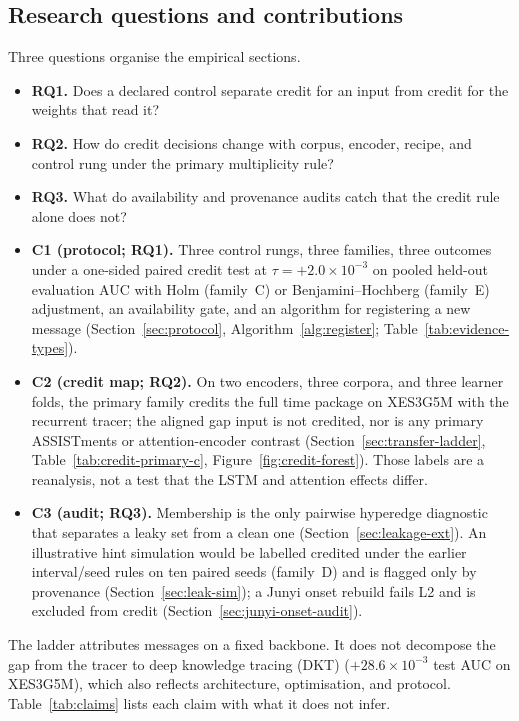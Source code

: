 \documentclass[review,12pt]{elsarticle}
\begin{document}
\subsection{Research questions and contributions}
Three questions organise the empirical sections.
\begin{itemize}
  \item \textbf{RQ1.} Does a declared control separate credit for an
  input from credit for the weights that read it?
  \item \textbf{RQ2.} How do credit decisions change with corpus,
  encoder, recipe, and control rung under the primary multiplicity rule?
  \item \textbf{RQ3.} What do availability and provenance audits catch
  that the credit rule alone does not?
\end{itemize}
\begin{itemize}
  \item \textbf{C1 (protocol; RQ1).} Three control rungs, three families,
  three outcomes under a one-sided paired credit test at
  $\tau{=}{+}2.0\times 10^{-3}$ on pooled held-out evaluation AUC with
  Holm (family~C) or Benjamini--Hochberg (family~E) adjustment, an
  availability gate, and an algorithm
  for registering a new message (Section~\ref{sec:protocol},
  Algorithm~\ref{alg:register}; Table~\ref{tab:evidence-types}).
  \item \textbf{C2 (credit map; RQ2).} On two encoders, three corpora,
  and three learner folds, the primary family credits the full time
  package on XES3G5M with the recurrent tracer; the aligned gap input
  is not credited, nor is any primary ASSISTments or attention-encoder
  contrast (Section~\ref{sec:transfer-ladder},
  Table~\ref{tab:credit-primary-c}, Figure~\ref{fig:credit-forest}).
  Those labels are a reanalysis, not a test that the LSTM and attention
  effects differ.
  \item \textbf{C3 (audit; RQ3).} Membership is the only pairwise
  hyperedge diagnostic that separates a leaky set from a clean one
  (Section~\ref{sec:leakage-ext}). An illustrative hint simulation would
  be labelled credited under the earlier interval/seed rules on ten
  paired seeds (family~D) and is flagged only by provenance
  (Section~\ref{sec:leak-sim}); a Junyi onset rebuild fails L2 and is
  excluded from credit (Section~\ref{sec:junyi-onset-audit}).
\end{itemize}
The ladder attributes messages on a fixed backbone. It does not
decompose the gap from the tracer to deep knowledge tracing (DKT)
\cite{piech2015dkt} ($+28.6\times 10^{-3}$ test AUC on
XES3G5M), which also reflects architecture, optimisation, and protocol.
Table~\ref{tab:claims} lists each claim with what it does not infer.

\end{document}
